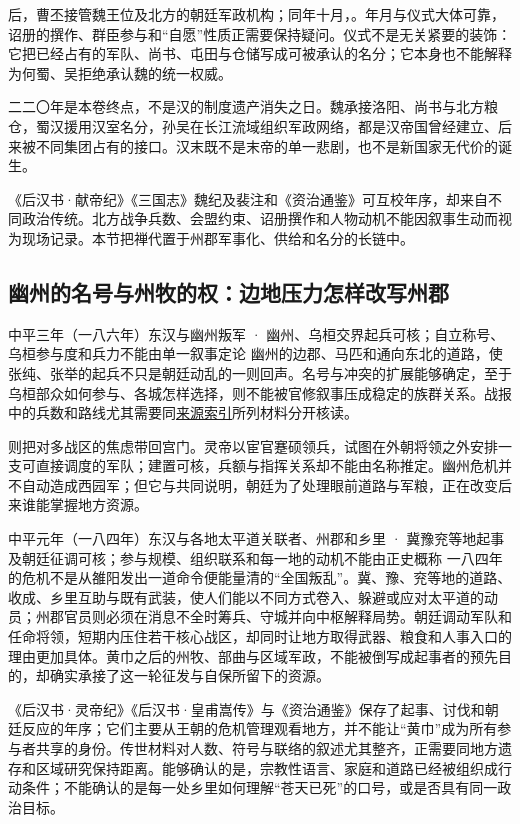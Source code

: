 后，曹丕接管魏王位及北方的朝廷军政机构；同年十月，。年月与仪式大体可靠，诏册的撰作、群臣参与和“自愿”性质正需要保持疑问。仪式不是无关紧要的装饰：它把已经占有的军队、尚书、屯田与仓储写成可被承认的名分；它本身也不能解释为何蜀、吴拒绝承认魏的统一权威。

二二〇年是本卷终点，不是汉的制度遗产消失之日。魏承接洛阳、尚书与北方粮仓，蜀汉援用汉室名分，孙吴在长江流域组织军政网络，都是汉帝国曾经建立、后来被不同集团占有的接口。汉末既不是末帝的单一悲剧，也不是新国家无代价的诞生。

\begin{sourcenote}[终局不是单一证词]
《后汉书·献帝纪》《三国志》魏纪及裴注和《资治通鉴》可互校年序，却来自不同政治传统。北方战争兵数、会盟约束、诏册撰作和人物动机不能因叙事生动而视为现场记录。本节把禅代置于州郡军事化、供给和名分的长链中。
\end{sourcenote}

\subsection{幽州的名号与州牧的权：边地压力怎样改写州郡}
\begin{event}{}{中平三年（一八六年）}{东汉与幽州叛军 · 幽州、乌桓交界}{起兵可核；自立称号、乌桓参与度和兵力不能由单一叙事定论}
幽州的边郡、马匹和通向东北的道路，使张纯、张举的起兵不只是朝廷动乱的一则回声。名号与冲突的扩展能够确定，至于乌桓部众如何参与、各城怎样选择，则不能被官修叙事压成稳定的族群关系。战报中的兵数和路线尤其需要同\hyperref[app:sources]{来源索引}所列材料分开核读。

则把对多战区的焦虑带回宫门。灵帝以宦官蹇硕领兵，试图在外朝将领之外安排一支可直接调度的军队；建置可核，兵额与指挥关系却不能由名称推定。幽州危机并不自动造成西园军；但它与共同说明，朝廷为了处理眼前道路与军粮，正在改变后来谁能掌握地方资源。
\end{event}

\begin{event}{}{中平元年（一八四年）}{东汉与各地太平道关联者、州郡和乡里 · 冀豫兖等地}{起事及朝廷征调可核；参与规模、组织联系和每一地的动机不能由正史概称}
一八四年的危机不是从雒阳发出一道命令便能量清的“全国叛乱”。冀、豫、兖等地的道路、收成、乡里互助与既有武装，使人们能以不同方式卷入、躲避或应对太平道的动员；州郡官员则必须在消息不全时筹兵、守城并向中枢解释局势。朝廷调动军队和任命将领，短期内压住若干核心战区，却同时让地方取得武器、粮食和人事入口的理由更加具体。黄巾之后的州牧、部曲与区域军政，不能被倒写成起事者的预先目的，却确实承接了这一轮征发与自保所留下的资源。

《后汉书·灵帝纪》《后汉书·皇甫嵩传》与《资治通鉴》保存了起事、讨伐和朝廷反应的年序；它们主要从王朝的危机管理观看地方，并不能让“黄巾”成为所有参与者共享的身份。传世材料对人数、符号与联络的叙述尤其整齐，正需要同地方遗存和区域研究保持距离。能够确认的是，宗教性语言、家庭和道路已经被组织成行动条件；不能确认的是每一处乡里如何理解“苍天已死”的口号，或是否具有同一政治目标。
\end{event}
